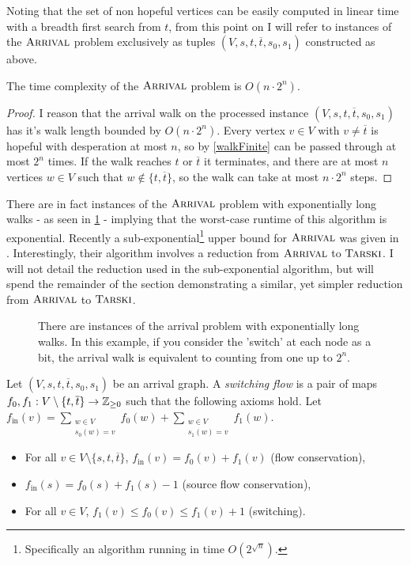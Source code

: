Noting that the set of non hopeful vertices can be easily computed in linear time with a breadth first search
from $t$, from this point on I will refer
to instances of the $\textsc{Arrival}$ problem exclusively as tuples $(V, s, t, \overline{t}, s_0, s_1)$ 
constructed as above.
\begin{cor}
  The time complexity of the $\textsc{Arrival}$ problem is $O(n \cdot 2^n)$.
\end{cor}
\begin{proof}
  I reason that the arrival walk on the processed instance $(V, s, t, \overline{t}, s_0, s_1)$
  has it's walk length bounded by $O(n \cdot 2^n)$. Every vertex $v \in V$ with $v \neq \overline{t}$
  is hopeful with desperation at most $n$, so by \cref{walkFinite} can be passed through at most
  $2^{n}$ times. If the walk reaches $t$ or $\overline{t}$ it terminates, and there are at most
  $n$ vertices $w \in V$ such that $w \not\in \{t, \overline{t}\}$, so the walk can take at most
  $n \cdot 2^n$ steps.
\end{proof}
There are in fact instances of the $\textsc{Arrival}$ problem with exponentially long walks -
as seen in \cref{expLongArrival} - implying that the worst-case runtime of this algorithm is exponential.
Recently a sub-exponential\footnote{Specifically an algorithm running
in time $O(2^{\sqrt{n}})$.} upper bound for $\textsc{Arrival}$ was given in \citep{gärtner2021subexponential}.
Interestingly, their algorithm involves a reduction from $\textsc{Arrival}$ to $\textsc{Tarski}$. I will not detail
the reduction used in the sub-exponential algorithm, but will spend the remainder of the section
demonstrating a similar, yet simpler reduction from $\textsc{Arrival}$ to $\textsc{Tarski}$.
\begin{figure}
  \centering
  
  \caption{There are instances of the arrival problem with exponentially long walks. In this example, if
  you consider the 'switch' at each node as a bit, the arrival walk is equivalent to counting from one up to $2^n$.}\label{expLongArrival}
\end{figure}
\newcommand{\fin}{f_{\text{in}}}
\begin{definition}
  Let $(V, s, t, \overline{t}, s_0, s_1)$ be an arrival graph. A \emph{switching flow} is a pair of maps 
  $f_0, f_1 : V \setminus \{t, \overline{t}\} \to \mathbb{Z}_{\geq 0}$ such that the following axioms hold.
    Let $\fin(v) =
        \sum_{\substack{w \in V \\ s_0(w) = v}} f_0(w) 
        + \sum_{\substack{w \in V \\ s_1(w) = v}} f_1(w)$. 
  \begin{itemize}
    \item For all $v \in V \setminus \{s, t, \overline{t}\}$, $\fin(v) = f_0(v) + f_1(v)$ (flow conservation),
    \item $\fin(s) = f_0(s) + f_1(s) - 1$ (source flow conservation),
    \item For all $v \in V$, $f_1(v) \leq f_0(v) \leq f_1(v) + 1$ (switching).
  \end{itemize}
\end{definition}
